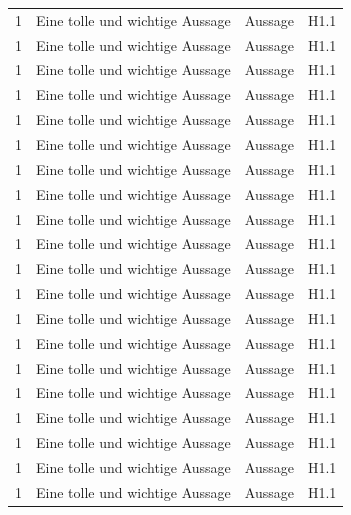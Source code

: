 \begin{longtable}{lp{5cm}p{5cm}c}
    1     & Eine tolle und wichtige Aussage & Aussage & H1.1\\
    1     & Eine tolle und wichtige Aussage & Aussage & H1.1\\
    1     & Eine tolle und wichtige Aussage & Aussage & H1.1\\
    1     & Eine tolle und wichtige Aussage & Aussage & H1.1\\
    1     & Eine tolle und wichtige Aussage & Aussage & H1.1\\
    1     & Eine tolle und wichtige Aussage & Aussage & H1.1\\
    1     & Eine tolle und wichtige Aussage & Aussage & H1.1\\
    1     & Eine tolle und wichtige Aussage & Aussage & H1.1\\
    1     & Eine tolle und wichtige Aussage & Aussage & H1.1\\
    1     & Eine tolle und wichtige Aussage & Aussage & H1.1\\
    1     & Eine tolle und wichtige Aussage & Aussage & H1.1\\
    1     & Eine tolle und wichtige Aussage & Aussage & H1.1\\
    1     & Eine tolle und wichtige Aussage & Aussage & H1.1\\
    1     & Eine tolle und wichtige Aussage & Aussage & H1.1\\
    1     & Eine tolle und wichtige Aussage & Aussage & H1.1\\
    1     & Eine tolle und wichtige Aussage & Aussage & H1.1\\
    1     & Eine tolle und wichtige Aussage & Aussage & H1.1\\
    1     & Eine tolle und wichtige Aussage & Aussage & H1.1\\
    1     & Eine tolle und wichtige Aussage & Aussage & H1.1\\
    1     & Eine tolle und wichtige Aussage & Aussage & H1.1\\
\end{longtable}